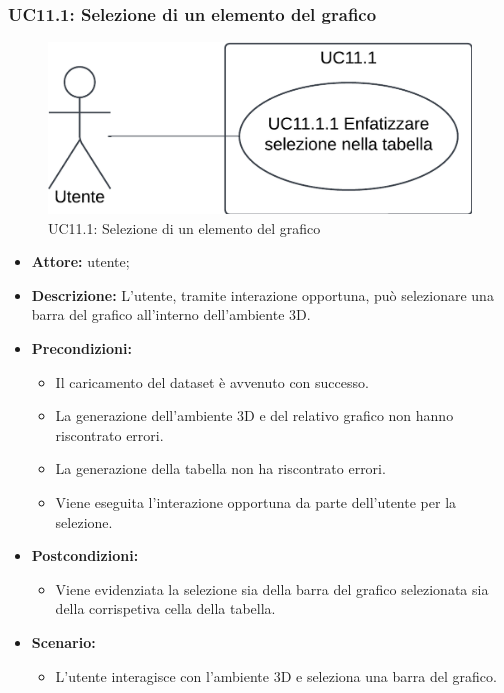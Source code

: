 \pagebreak

\subsubsection{UC11.1: Selezione di un elemento del grafico}
\begin{figure}[h!]\centering
    \includegraphics[scale=0.7]{template/images/UC11.1.png}
    \caption{UC11.1: Selezione di un elemento del grafico}
\end{figure}
\begin{itemize}    
    \item \textbf{Attore:} utente;
    \item \textbf{Descrizione:} L'utente, tramite interazione opportuna, può selezionare una barra del grafico all'interno dell'ambiente 3D.
    \item \textbf{Precondizioni:}    
        \begin{itemize}
            \item Il caricamento del dataset è avvenuto con successo.
            \item La generazione dell'ambiente 3D e del relativo grafico non hanno riscontrato errori.
            \item La generazione della tabella non ha riscontrato errori.
            \item Viene eseguita l'interazione opportuna da parte dell'utente per la selezione.
        \end{itemize}    
    \item \textbf{Postcondizioni:}
        \begin{itemize}
            \item Viene evidenziata la selezione sia della barra del grafico selezionata sia della corrispetiva cella della tabella.
        \end{itemize}    
    \item \textbf{Scenario:} 
        \begin{itemize}
            \item L'utente interagisce con l'ambiente 3D e seleziona una barra del grafico.
        \end{itemize}
\end{itemize}
